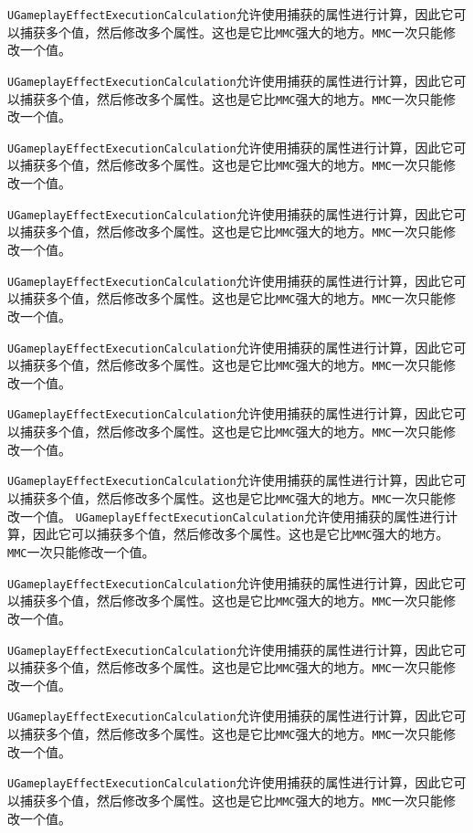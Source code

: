 \documentclass[10pt,a4paper,x11names,dvipsnames,svgnames,oneside]{ctexbook}
\begin{document}
\begin{df}
	
	\texttt{UGameplayEffectExecutionCalculation}允许使用捕获的属性进行计算，因此它可以捕获多个值，然后修改多个属性。这也是它比\texttt{MMC}强大的地方。\texttt{MMC}一次只能修改一个值。
	
	
	\texttt{UGameplayEffectExecutionCalculation}允许使用捕获的属性进行计算，因此它可以捕获多个值，然后修改多个属性。这也是它比\texttt{MMC}强大的地方。\texttt{MMC}一次只能修改一个值。
	
	\texttt{UGameplayEffectExecutionCalculation}允许使用捕获的属性进行计算，因此它可以捕获多个值，然后修改多个属性。这也是它比\texttt{MMC}强大的地方。\texttt{MMC}一次只能修改一个值。
	
	
	\texttt{UGameplayEffectExecutionCalculation}允许使用捕获的属性进行计算，因此它可以捕获多个值，然后修改多个属性。这也是它比\texttt{MMC}强大的地方。\texttt{MMC}一次只能修改一个值。
	
	
	\texttt{UGameplayEffectExecutionCalculation}允许使用捕获的属性进行计算，因此它可以捕获多个值，然后修改多个属性。这也是它比\texttt{MMC}强大的地方。\texttt{MMC}一次只能修改一个值。
	
	
	\texttt{UGameplayEffectExecutionCalculation}允许使用捕获的属性进行计算，因此它可以捕获多个值，然后修改多个属性。这也是它比\texttt{MMC}强大的地方。\texttt{MMC}一次只能修改一个值。
	
	
	\texttt{UGameplayEffectExecutionCalculation}允许使用捕获的属性进行计算，因此它可以捕获多个值，然后修改多个属性。这也是它比\texttt{MMC}强大的地方。\texttt{MMC}一次只能修改一个值。
	
	
	\texttt{UGameplayEffectExecutionCalculation}允许使用捕获的属性进行计算，因此它可以捕获多个值，然后修改多个属性。这也是它比\texttt{MMC}强大的地方。\texttt{MMC}一次只能修改一个值。	
	\texttt{UGameplayEffectExecutionCalculation}允许使用捕获的属性进行计算，因此它可以捕获多个值，然后修改多个属性。这也是它比\texttt{MMC}强大的地方。\texttt{MMC}一次只能修改一个值。
	
	
	\texttt{UGameplayEffectExecutionCalculation}允许使用捕获的属性进行计算，因此它可以捕获多个值，然后修改多个属性。这也是它比\texttt{MMC}强大的地方。\texttt{MMC}一次只能修改一个值。
	
	
	\texttt{UGameplayEffectExecutionCalculation}允许使用捕获的属性进行计算，因此它可以捕获多个值，然后修改多个属性。这也是它比\texttt{MMC}强大的地方。\texttt{MMC}一次只能修改一个值。
	
	
	\texttt{UGameplayEffectExecutionCalculation}允许使用捕获的属性进行计算，因此它可以捕获多个值，然后修改多个属性。这也是它比\texttt{MMC}强大的地方。\texttt{MMC}一次只能修改一个值。
	
	
	\texttt{UGameplayEffectExecutionCalculation}允许使用捕获的属性进行计算，因此它可以捕获多个值，然后修改多个属性。这也是它比\texttt{MMC}强大的地方。\texttt{MMC}一次只能修改一个值。
\end{df}
\end{document}
